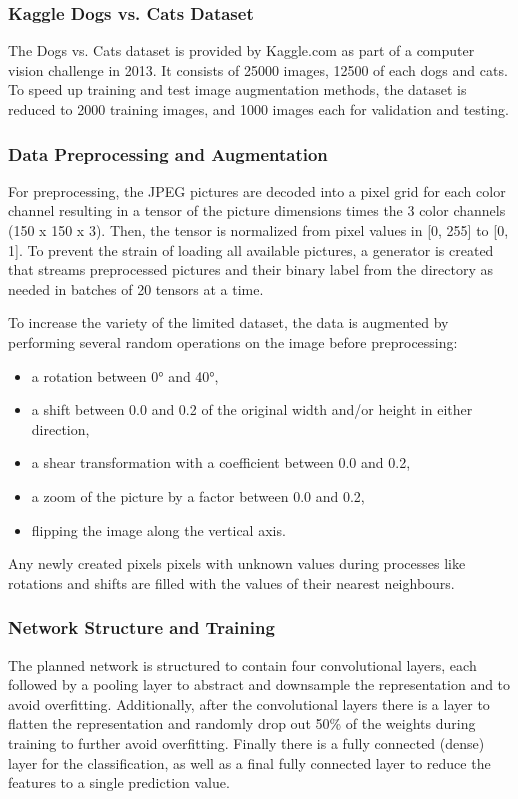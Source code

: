 \documentclass[sigconf]{acmart}
\begin{document}
\subsubsection{Kaggle Dogs vs. Cats Dataset \cite{Kaggle}}
The Dogs vs. Cats dataset is provided by Kaggle.com as part of a computer vision challenge in 2013.
It consists of 25000 images, 12500 of each dogs and cats.
To speed up training and test image augmentation methods, the dataset is reduced to 2000 training images, and 1000 images each for validation and testing.

\subsubsection{Data Preprocessing and Augmentation}
For preprocessing, the JPEG pictures are decoded into a pixel grid for each color channel resulting in a tensor of the picture dimensions times the 3 color channels (150 x 150 x 3).
Then, the tensor is normalized from pixel values in [0, 255] to [0, 1].
To prevent the strain of loading all available pictures, a generator is created that streams preprocessed pictures and their binary label from the directory as needed in batches of 20 tensors at a time.

To increase the variety of the limited dataset, the data is augmented by performing several random operations on the image before preprocessing:
\begin{itemize}
\item a rotation between 0° and 40°,
\item a shift between 0.0 and 0.2 of the original width and/or height in either direction,
\item a shear transformation with a coefficient between 0.0 and 0.2,
\item a zoom of the picture by a factor between 0.0 and 0.2,
\item flipping the image along the vertical axis.
\end{itemize}
Any newly created pixels pixels with unknown values during processes like rotations and shifts are filled with the values of their nearest neighbours.

\subsubsection{Network Structure and Training}
The planned network is structured to contain four convolutional layers, each followed by a pooling layer to abstract and downsample the representation and to avoid overfitting.
Additionally, after the convolutional layers there is a layer to flatten the representation and randomly drop out 50\% of the weights during training to further avoid overfitting.
Finally there is a fully connected (dense) layer for the classification, as well as a final fully connected layer to reduce the features to a single prediction value.
\end{document}
